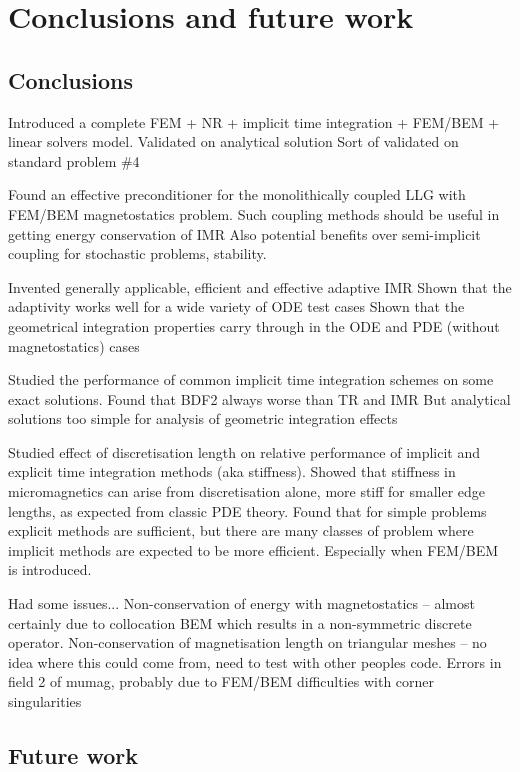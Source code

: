 \chapter{Conclusions and future work}

\section{Conclusions}

Introduced a complete FEM + NR + implicit time integration + FEM/BEM + linear solvers model.
Validated on analytical solution
Sort of validated on \mumag standard problem \#4

Found an effective preconditioner for the monolithically coupled LLG with FEM/BEM magnetostatics problem.
Such coupling methods should be useful in getting energy conservation of IMR
Also potential benefits over semi-implicit coupling for stochastic problems, stability.


Invented generally applicable, efficient and effective adaptive IMR
Shown that the adaptivity works well for a wide variety of ODE test cases
Shown that the geometrical integration properties carry through in the ODE and PDE (without magnetostatics) cases

Studied the performance of common implicit time integration schemes on some exact solutions.
Found that BDF2 always worse than TR and IMR
But analytical solutions too simple for analysis of geometric integration effects

Studied effect of discretisation length on relative performance of implicit and explicit time integration methods (aka stiffness).
Showed that stiffness in micromagnetics can arise from discretisation alone, more stiff for smaller edge lengths, as expected from classic PDE theory.
Found that for simple problems explicit methods are sufficient, but there are many classes of problem where implicit methods are expected to be more efficient.
Especially when FEM/BEM is introduced.


Had some issues...
Non-conservation of energy with magnetostatics -- almost certainly due to collocation BEM which results in a non-symmetric discrete operator.
Non-conservation of magnetisation length on triangular meshes -- no idea where this could come from, need to test with other peoples code.
Errors in field 2 of mumag, probably due to FEM/BEM difficulties with corner singularities

\section{Future work}

